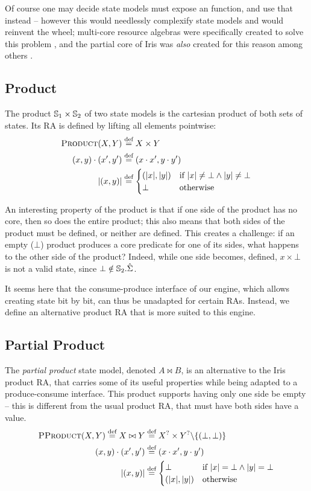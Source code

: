 Of course one may decide state models must expose an  function, and use that instead -- however this would needlessly complexify state models and would reinvent the wheel; multi-core resource algebras were specifically created to solve this problem \cite{sepalgebra}, and the partial core of Iris was \emph{also} created for this reason among others \cite{iris}.

\subsection{Product}

The product $\mathbb S_1 \times \mathbb S_2$ of two state models is the cartesian product of both sets of states. Its RA is defined by lifting all elements pointwise: \begin{align*}
 	\textsc{Product}(X,Y)&\stackrel{\textnormal{def}}= X \times Y\\
 	(x,y)\cdot(x',y') &\stackrel{\textnormal{def}}= (x\cdot x',y\cdot y')\\
 	|(x,y)|&\stackrel{\textnormal{def}}= \begin{cases}
(|x|, |y|) &\text{if}~|x|\neq\bot \land |y|\neq\bot\\
\bot&\text{otherwise}
 \end{cases}
 \end{align*}

An interesting property of the product is that if one side of the product has no core, then so does the entire product; this also means that both sides of the product must be defined, or neither are defined. This creates a challenge: if an empty ($\bot$) product produces a core predicate for one of its sides, what happens to the other side of the product? Indeed, while one side becomes, defined, $x\times \bot$ is not a valid state, since $\bot \notin \mathbb S_2.\hat{\Sigma}$.

It seems here that the consume-produce interface of our engine, which allows creating state bit by bit, can thus be unadapted for certain RAs. Instead, we define an alternative product RA that is more suited to this engine.

\subsection{Partial Product}

The \emph{partial product} state model, denoted $A \bowtie B$, is an alternative to the Iris product RA, that carries some of its useful properties while being adapted to a produce-consume interface. This product supports having only one side be empty -- this is different from the usual product RA, that must have both sides have a value.
\begin{align*}
	\textsc{PProduct}(X,Y) \stackrel{\textnormal{def}}= X \bowtie Y &\stackrel{\textnormal{def}}= X^? \times Y^? \backslash \{(\bot, \bot)\}\\
	(x, y) \cdot (x', y') &\stackrel{\textnormal{def}}= (x \cdot x', y \cdot y')\\
	|(x, y)| &\stackrel{\textnormal{def}}= \begin{cases}
		\bot &\text{if}~|x|=\bot\land |y|=\bot\\
		(|x|, |y|) &\text{otherwise}
 	\end{cases}	\\
\end{align*}

